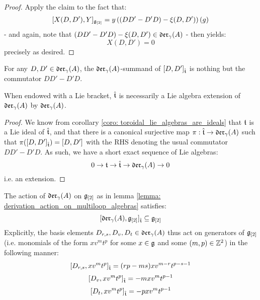 \begin{proof}
                Apply the claim to the fact that:
                    $$[X(D, D'), Y]_{\mathfrak{g}_{[2]}} = y \left( ( DD' - D'D) - \xi(D, D') \right)( g )$$
                - and again, note that $( DD' - D'D) - \xi(D, D') \in \mathfrak{der}_{\gamma}(A)$ - then yields:
                    $$X(D, D') = 0$$
                precisely as desired. 
            \end{proof}
        \begin{corollary}
            For any $D, D' \in \mathfrak{der}_{\gamma}(A)$, the $\mathfrak{der}_{\gamma}(A)$-summand of $[D, D']_{\hat{\mathfrak{t}}}$ is nothing but the commutator $DD' - D'D$.
        \end{corollary}
        \begin{corollary} \label{coro: yangian_extended_toroidal_lie_algebras_are_extensions}
            When endowed with a Lie bracket, $\hat{\mathfrak{t}}$ is necessarily a Lie algebra extension of $\mathfrak{der}_{\gamma}(A)$ by $\mathfrak{der}_{\gamma}(A)$.
        \end{corollary}
            \begin{proof}
                We know from corollary \ref{coro: toroidal_lie_algebras_are_ideals} that $\mathfrak{t}$ is a Lie ideal of $\hat{\mathfrak{t}}$, and that there is a canonical surjective map $\pi: \hat{\mathfrak{t}} \to \mathfrak{der}_{\gamma}(A)$ such that $\pi([D, D']_{\hat{\mathfrak{t}}}) = [D, D']$ with the RHS denoting the usual commutator $DD' - D'D$. As such, we have a short exact sequence of Lie algebras:
                    $$0 \to \mathfrak{t} \to \hat{\mathfrak{t}} \to \mathfrak{der}_{\gamma}(A) \to 0$$
                i.e. an extension.
            \end{proof}
        \begin{corollary} \label{coro: derivation_action_on_multiloop_algebras}
            The action of $\mathfrak{der}_{\gamma}(A)$ on $\mathfrak{g}_{[2]}$ as in lemma \ref{lemma: derivation_action_on_multiloop_algebras} satisfies:
                $$[\mathfrak{der}_{\gamma}(A), \mathfrak{g}_{[2]}]_{\hat{\mathfrak{t}}} \subseteq \mathfrak{g}_{[2]}$$
            Explicitly, the basis elements $D_{r, s}, D_v, D_t \in \mathfrak{der}_{\gamma}(A)$ thus act on generators of $\mathfrak{g}_{[2]}$ (i.e. monomials of the form $x v^m t^p$ for some $x \in \mathfrak{g}$ and some $(m, p) \in \mathbb{Z}^2$) in the following manner:
                $$[D_{r, s}, x v^m t^p]_{\hat{\mathfrak{t}}} = (rp - ms) x v^{m - r} t^{p - s - 1}$$
                $$[D_v, x v^m t^p]_{\hat{\mathfrak{t}}} = -m x v^m t^{p - 1}$$
                $$[D_t, x v^m t^p]_{\hat{\mathfrak{t}}} = -p x v^m t^{p - 1}$$
        \end{corollary}
